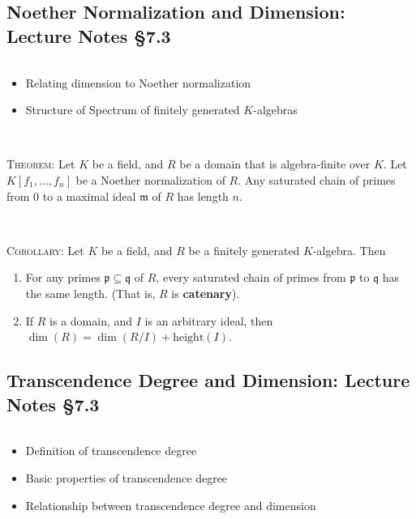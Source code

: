 \documentclass[12pt]{amsart}
\newcommand{\m}{\mathfrak{m}}
\newcommand{\p}{\mathfrak{p}}
\newcommand{\q}{\mathfrak{q}}
\newcommand{\0}{$\phantom{.}$}
\newcommand{\1}{\mathbbm{1}}
\begin{document}
\newpage

\subsection{Noether Normalization and Dimension: Lecture Notes \S7.3} \0

\begin{framed}
\begin{itemize}
\item Relating dimension to Noether normalization
\item Structure of Spectrum of finitely generated $K$-algebras
\end{itemize}
\end{framed}

\

\noindent	\textsc{Theorem:} Let $K$ be a field, and $R$ be a domain that is algebra-finite over $K$. Let $K[f_1,\dots,f_n]$ be a Noether normalization of $R$. Any saturated chain of primes from $0$ to a maximal ideal $\m$ of $R$ has length $n$.

\

\noindent	\textsc{Corollary:} Let $K$ be a field, and $R$ be a finitely generated $K$-algebra. Then
\begin{enumerate}
\item For any primes $\p \subseteq \q$ of $R$, every saturated chain of primes from $\p$ to $\q$ has the same length. (That is, $R$ is \textbf{catenary}).
\item If $R$ is a domain, and $I$ is an arbitrary ideal, then $\dim(R) = \dim(R/I) + \mathrm{height}(I)$.
\end{enumerate}



\newpage

\subsection{Transcendence Degree and Dimension: Lecture Notes \S7.3} \0

\begin{framed}
\begin{itemize}
\item Definition of transcendence degree
\item Basic properties of transcendence degree
\item Relationship between transcendence degree and dimension
\end{itemize}
\end{framed}
\end{document}
